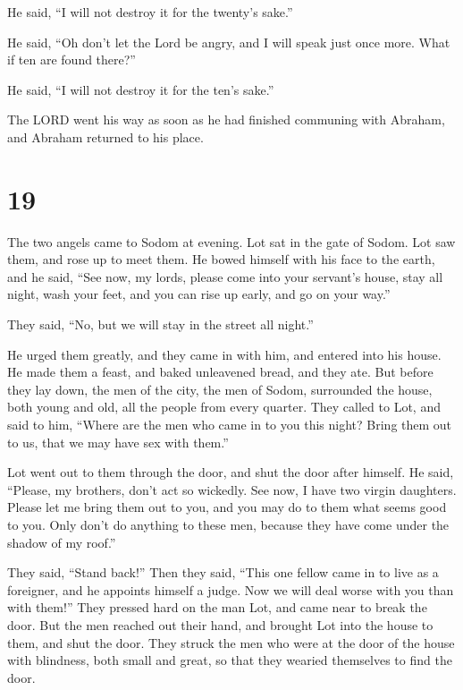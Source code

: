 He said, ``I will not destroy it for the twenty's sake.''

 He said, ``Oh don't let the Lord be angry, and I will
speak just once more. What if ten are found there?''

He said, ``I will not destroy it for the ten's sake.''

 The LORD went his way as soon as he had finished
communing with Abraham, and Abraham returned to his place.

\hypertarget{section-18}{%
\section{19}\label{section-18}}

 The two angels came to Sodom at evening. Lot sat in the
gate of Sodom. Lot saw them, and rose up to meet them. He bowed himself
with his face to the earth,  and he said, ``See now, my
lords, please come into your servant's house, stay all night, wash your
feet, and you can rise up early, and go on your way.''

They said, ``No, but we will stay in the street all night.''

 He urged them greatly, and they came in with him, and
entered into his house. He made them a feast, and baked unleavened
bread, and they ate.  But before they lay down, the men of
the city, the men of Sodom, surrounded the house, both young and old,
all the people from every quarter.  They called to Lot,
and said to him, ``Where are the men who came in to you this night?
Bring them out to us, that we may have sex with them.''

 Lot went out to them through the door, and shut the door
after himself.  He said, ``Please, my brothers, don't act
so wickedly.  See now, I have two virgin daughters. Please
let me bring them out to you, and you may do to them what seems good to
you. Only don't do anything to these men, because they have come under
the shadow of my roof.''

 They said, ``Stand back!'' Then they said, ``This one
fellow came in to live as a foreigner, and he appoints himself a judge.
Now we will deal worse with you than with them!'' They pressed hard on
the man Lot, and came near to break the door.  But the
men reached out their hand, and brought Lot into the house to them, and
shut the door.  They struck the men who were at the door
of the house with blindness, both small and great, so that they wearied
themselves to find the door.

